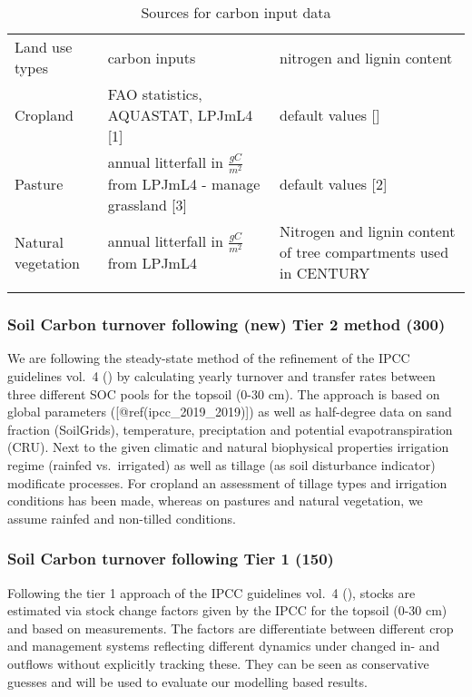 \documentclass[gc, manuscript]{copernicus}
\begin{document}
\begin{table*}[h]
\caption{Sources for carbon input data}
\begin{tabular}{l l l}
\tophline
 Land use types   & carbon inputs & nitrogen and lignin content \\
\middlehline
 Cropland         & FAO statistics, AQUASTAT, LPJmL4 [1] & default values [\cite{ipcc_2006_2006}] \\
 Pasture          & annual litterfall in $\tfrac{gC}{m^2}$ from LPJmL4 - manage grassland [3] & default values [2] \\
 Natural vegetation & annual litterfall in $\tfrac{gC}{m^2}$ from LPJmL4  & \begin{minipage}[t]{0.37\columnwidth}\raggedright\strut Nitrogen and lignin content of tree compartments used in CENTURY \strut \end{minipage}\tabularnewline
\bottomhline
\end{tabular}
\label{tab:datasourceinputs}
\belowtable{}
\end{table*}

\subsubsection{Soil Carbon turnover following (new) Tier 2 method
(300)}\label{sec:tier2}

We are following the steady-state method of the refinement of the IPCC
guidelines vol.~4 (\citet{ipcc_2019_2019}) by calculating yearly
turnover and transfer rates between three different SOC pools for the
topsoil (0-30 cm). The approach is based on global parameters
({[}@ref(ipcc\_2019\_2019){]}) as well as half-degree data on sand
fraction (SoilGrids), temperature, preciptation and potential
evapotranspiration (CRU). Next to the given climatic and natural
biophysical properties irrigation regime (rainfed vs.~irrigated) as well
as tillage (as soil disturbance indicator) modificate processes. For
cropland an assessment of tillage types and irrigation conditions has
been made, whereas on pastures and natural vegetation, we assume rainfed
and non-tilled conditions.

\subsubsection{Soil Carbon turnover following Tier 1
(150)}\label{sec:tier1}

Following the tier 1 approach of the IPCC guidelines vol.~4
(\citet{ipcc_2006_2006}), stocks are estimated via stock change factors
given by the IPCC for the topsoil (0-30 cm) and based on measurements.
The factors are differentiate between different crop and management
systems reflecting different dynamics under changed in- and outflows
without explicitly tracking these. They can be seen as conservative
guesses and will be used to evaluate our modelling based results.
\end{document}
